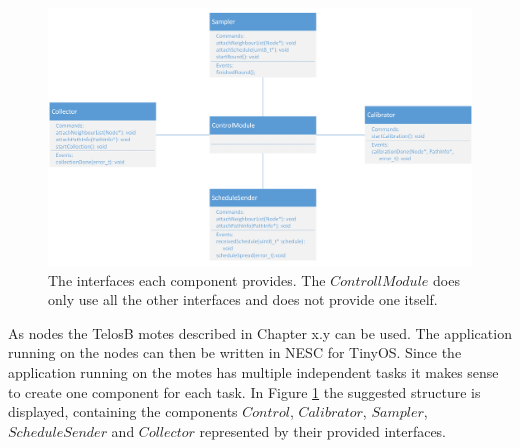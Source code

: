 \begin{figure}[htbp]
	\centering
    \includegraphics[scale=0.6]{content/images/Motes/GeneralStructure}
   	\caption{The interfaces each component provides. The $ControllModule$ does only use all the other interfaces and does not provide one itself.}
    \label{fig:moteStructure}
\end{figure}

As nodes the TelosB motes described in Chapter x.y can be used. The application running on the nodes can then be written in NESC for TinyOS. Since the application running on the motes has multiple independent tasks it makes sense to create one component for each task. In Figure \ref{fig:moteStructure} the suggested structure is displayed, containing the components $Control$, $Calibrator$, $Sampler$, $ScheduleSender$ and $Collector$ represented by their provided interfaces. 

